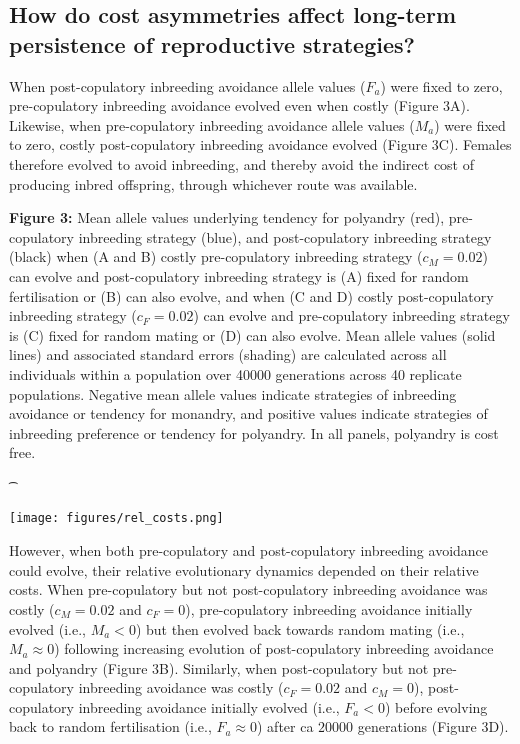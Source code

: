 \documentclass[10pt,letterpaper]{article}
\begin{document}
\subsection*{How do cost asymmetries affect long-term persistence of reproductive strategies?}

When post-copulatory inbreeding avoidance allele values ($F_{a}$) were fixed to zero, pre-copulatory inbreeding avoidance evolved even when costly (Figure 3A). Likewise, when pre-copulatory inbreeding avoidance allele values ($M_{a}$) were fixed to zero, costly post-copulatory inbreeding avoidance evolved (Figure 3C). Females therefore evolved to avoid inbreeding, and thereby avoid the indirect cost of producing inbred offspring, through whichever route was available. 

{\color{Gray}
\begin{adjustwidth}{-2.2in}{0in}
{%
   \begin{justify}\vspace{0.25 mm} \textbf{Figure 3:} Mean allele values underlying tendency for polyandry (red), pre-copulatory inbreeding strategy (blue), and post-copulatory inbreeding strategy (black) when (A and B) costly pre-copulatory inbreeding strategy ($c_{M} = 0.02$) can evolve and post-copulatory inbreeding strategy is (A) fixed for random fertilisation or (B) can also evolve, and when (C and D) costly post-copulatory inbreeding strategy ($c_{F} = 0.02$) can evolve and pre-copulatory inbreeding strategy is (C) fixed for random mating or (D) can also evolve. Mean allele values (solid lines) and associated standard errors (shading) are calculated across all individuals within a population over 40000 generations across 40 replicate populations. Negative mean allele values indicate strategies of inbreeding avoidance or tendency for monandry, and positive values indicate strategies of inbreeding preference or tendency for polyandry. In all panels, polyandry is cost free. \end{justify}{\t}%
}
{%
   \texttt{[image: figures/rel\_costs.png]}%
}%
\end{adjustwidth}
}

However, when both pre-copulatory and post-copulatory inbreeding avoidance could evolve, their relative evolutionary dynamics depended on their relative costs. When pre-copulatory but not post-copulatory inbreeding avoidance was costly ($c_{M}=0.02$ and $c_{F}=0$), pre-copulatory inbreeding avoidance initially evolved (i.e., $M_{a} < 0$) but then evolved back towards random mating (i.e., $M_{a} \approx 0$) following increasing evolution of post-copulatory inbreeding avoidance and polyandry (Figure 3B). Similarly, when post-copulatory but not pre-copulatory inbreeding avoidance was costly ($c_{F}=0.02$ and $c_{M}=0$), post-copulatory inbreeding avoidance initially evolved (i.e., $F_{a} < 0$) before evolving back to random fertilisation (i.e., $F_{a} \approx 0$) after ca $20000$ generations (Figure 3D). 
\end{document}
